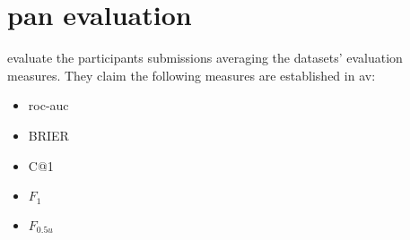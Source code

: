 \section{\acs{pan} evaluation}
\label{sec:pan_evaluation}

\citet{ayele_overview_2024} evaluate the participants submissions averaging the datasets' evaluation measures.
They claim the following measures are established in \ac{av}:
\begin{itemize}
    \item \ac{roc-auc}
    \item BRIER
    \item C@1
    \item $F_1$
    \item $F_{0.5u}$
\end{itemize}